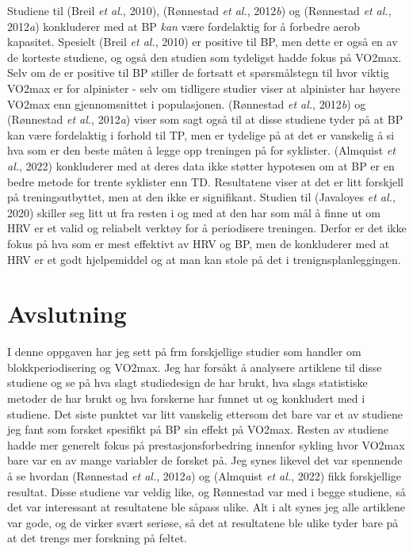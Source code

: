 \documentclass[
  letterpaper,
  DIV=11,
  numbers=noendperiod]{scrreprt}
\begin{document}
Studiene til (Breil \emph{et al.}, 2010), (Rønnestad \emph{et al.},
2012\emph{b}) og (Rønnestad \emph{et al.}, 2012\emph{a}) konkluderer med
at BP \emph{kan} være fordelaktig for å forbedre aerob kapasitet.
Spesielt (Breil \emph{et al.}, 2010) er positive til BP, men dette er
også en av de korteste studiene, og også den studien som tydeligst hadde
fokus på VO2max. Selv om de er positive til BP stiller de fortsatt et
spørsmålstegn til hvor viktig VO2max er for alpinister - selv om
tidligere studier viser at alpinister har høyere VO2max enn
gjennomsnittet i populasjonen. (Rønnestad \emph{et al.}, 2012\emph{b})
og (Rønnestad \emph{et al.}, 2012\emph{a}) viser som sagt også til at
disse studiene tyder på at BP kan være fordelaktig i forhold til TP, men
er tydelige på at det er vanskelig å si hva som er den beste måten å
legge opp treningen på for syklister. (Almquist \emph{et al.}, 2022)
konkluderer med at deres data ikke støtter hypotesen om at BP er en
bedre metode for trente syklister enn TD. Resultatene viser at det er
litt forskjell på treningsutbyttet, men at den ikke er signifikant.
Studien til (Javaloyes \emph{et al.}, 2020) skiller seg litt ut fra
resten i og med at den har som mål å finne ut om HRV er et valid og
reliabelt verktøy for å periodisere treningen. Derfor er det ikke fokus
på hva som er mest effektivt av HRV og BP, men de konkluderer med at HRV
er et godt hjelpemiddel og at man kan stole på det i
trenignsplanleggingen.

\section{Avslutning}\label{avslutning}

I denne oppgaven har jeg sett på frm forskjellige studier som handler om
blokkperiodisering og VO2max. Jeg har forsåkt å analysere artiklene til
disse studiene og se på hva slagt studiedesign de har brukt, hva slags
statistiske metoder de har brukt og hva forskerne har funnet ut og
konkludert med i studiene. Det siste punktet var litt vanskelig ettersom
det bare var et av studiene jeg fant som forsket spesifikt på BP sin
effekt på VO2max. Resten av studiene hadde mer generelt fokus på
prestasjonsforbedring innenfor sykling hvor VO2max bare var en av mange
variabler de forsket på. Jeg synes likevel det var spennende å se
hvordan (Rønnestad \emph{et al.}, 2012\emph{a}) og (Almquist \emph{et
al.}, 2022) fikk forskjellige resultat. Disse studiene var veldig like,
og Rønnestad var med i begge studiene, så det var interessant at
resultatene ble såpass ulike. Alt i alt synes jeg alle artiklene var
gode, og de virker svært seriøse, så det at resultatene ble ulike tyder
bare på at det trengs mer forskning på feltet.
\end{document}
